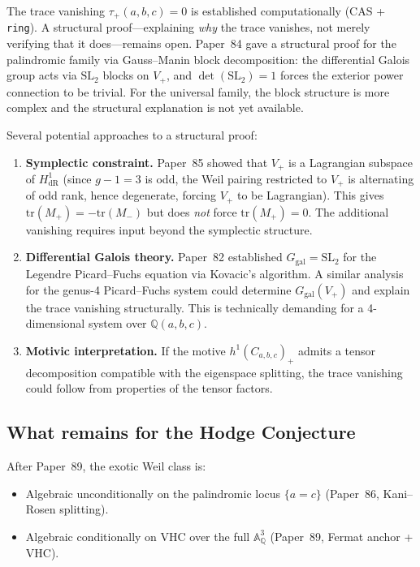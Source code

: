 \documentclass[11pt,a4paper]{article}
\theoremstyle{definition}
\theoremstyle{remark}
\newcommand{\QQ}{\mathbb{Q}}
\newcommand{\Aff}{\mathbb{A}}
\newcommand{\SL}{\mathrm{SL}}
\newcommand{\tr}{\mathrm{tr}}
\begin{document}
The trace vanishing $\tau_+(a,b,c) = 0$ is established computationally
(CAS + \texttt{ring}).
A structural proof---explaining \emph{why} the trace vanishes, not merely
verifying that it does---remains open.
Paper~84 gave a structural proof for the palindromic family via
Gauss--Manin block decomposition: the differential Galois group acts via
$\SL_2$ blocks on $V_+$, and $\det(\SL_2) = 1$ forces the exterior power
connection to be trivial.
For the universal family, the block structure is more complex and the
structural explanation is not yet available.

Several potential approaches to a structural proof:
\begin{enumerate}[nosep]
  \item \textbf{Symplectic constraint.}
    Paper~85 showed that $V_+$ is a Lagrangian subspace of $H^1_{\mathrm{dR}}$
    (since $g-1 = 3$ is odd, the Weil pairing restricted to $V_+$ is
    alternating of odd rank, hence degenerate, forcing $V_+$ to be
    Lagrangian).
    This gives $\tr(M_+) = -\tr(M_-)$ but does \emph{not} force
    $\tr(M_+) = 0$.
    The additional vanishing requires input beyond the symplectic structure.

  \item \textbf{Differential Galois theory.}
    Paper~82 established $G_{\mathrm{gal}} = \SL_2$ for the Legendre
    Picard--Fuchs equation via Kovacic's algorithm.
    A similar analysis for the genus-4 Picard--Fuchs system could determine
    $G_{\mathrm{gal}}(V_+)$ and explain the trace vanishing structurally.
    This is technically demanding for a 4-dimensional system over
    $\QQ(a,b,c)$.

  \item \textbf{Motivic interpretation.}
    If the motive $h^1(C_{a,b,c})_+$ admits a tensor decomposition
    compatible with the eigenspace splitting, the trace vanishing could
    follow from properties of the tensor factors.
\end{enumerate}

\subsection{What remains for the Hodge Conjecture}

After Paper~89, the exotic Weil class is:
\begin{itemize}[nosep]
  \item Algebraic unconditionally on the palindromic locus $\{a = c\}$
        (Paper~86, Kani--Rosen splitting).
  \item Algebraic conditionally on VHC over the full $\Aff^3_\QQ$
        (Paper~89, Fermat anchor + VHC).
\end{itemize}
\end{document}

